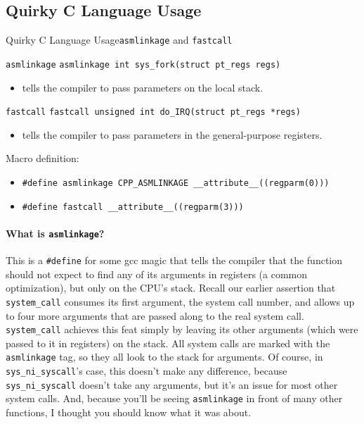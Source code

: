 \subsection{Quirky C Language Usage}

\begin{frame}[fragile=singleslide]{Quirky C Language Usage}{\texttt{asmlinkage} and \texttt{fastcall}}
  \begin{block}{\texttt{asmlinkage}}
    \texttt{asmlinkage int sys_fork(struct pt_regs regs)}
    \begin{itemize}
    \item tells the compiler to pass parameters on the local stack.
    \end{itemize}
  \end{block}
  \begin{block}{\texttt{fastcall}}
    \texttt{fastcall unsigned int do_IRQ(struct pt_regs *regs)}
    \begin{itemize}
    \item tells the compiler to pass parameters in the general-purpose registers.
    \end{itemize}
  \end{block}
  Macro definition:
  \begin{itemize}
  \item \texttt{#define asmlinkage CPP_ASMLINKAGE __attribute__((regparm(0)))}
  \item \texttt{#define fastcall __attribute__((regparm(3)))}
  \end{itemize} 
\end{frame}

\paragraph{What is \texttt{asmlinkage}?}

This is a \texttt{\#define} for some gcc magic that tells the compiler that the function
should not expect to find any of its arguments in registers (a common optimization), but
only on the CPU's stack. Recall our earlier assertion that \texttt{system\_call} consumes
its first argument, the system call number, and allows up to four more arguments that are
passed along to the real system call. \texttt{system\_call} achieves this feat simply by
leaving its other arguments (which were passed to it in registers) on the stack. All
system calls are marked with the \texttt{asmlinkage} tag, so they all look to the stack for
arguments. Of course, in \texttt{sys\_ni\_syscall}'s case, this doesn't make any difference,
because \texttt{sys\_ni\_syscall} doesn't take any arguments, but it's an issue for most
other system calls. And, because you'll be seeing \texttt{asmlinkage} in front of many other
functions, I thought you should know what it was about. 
  
